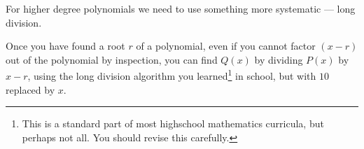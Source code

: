 
For higher degree polynomials we need to use something more systematic --- long
division.
\begin{trick}
Once you have found a root $r$ of a polynomial, even if you cannot factor
$(x-r)$ out of the polynomial by inspection, you can find $Q(x)$
by dividing $P(x)$ by $x-r$, using the long division algorithm you learned\footnote{This
is a standard part of most highschool mathematics curricula, but perhaps not all. You
should revise this carefully.} in school, but with $10$ replaced by $x$.
\end{trick}

